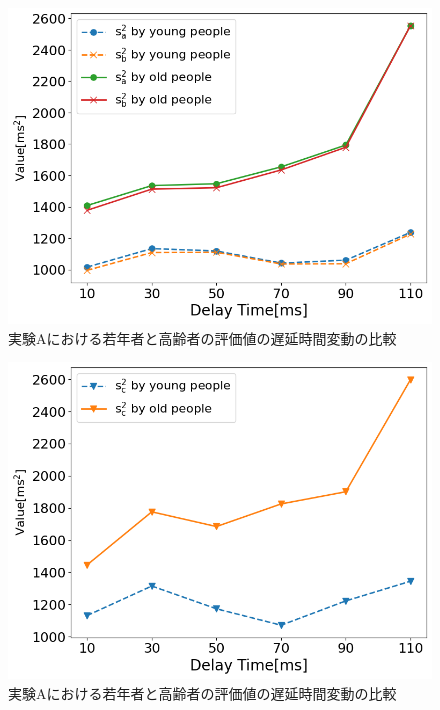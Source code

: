
\begin{figure}[tbp]
  \centering
  \includegraphics[scale=0.5]{figures/Honbann/Comparison_young_old/Var_110ms_Sa_Sb.png}
  \caption{実験Aにおける若年者と高齢者の評価値の遅延時間変動の比較}
  \label{fig:Var_110ms_Sa_Sb}
\end{figure}
\begin{figure}[tbp]
  \centering
  \includegraphics[scale=0.5]{figures/Honbann/Comparison_young_old/Var_110ms_Sc.png}
  \caption{実験Aにおける若年者と高齢者の評価値の遅延時間変動の比較}
  \label{fig:Var_110ms_Sc}
\end{figure}

